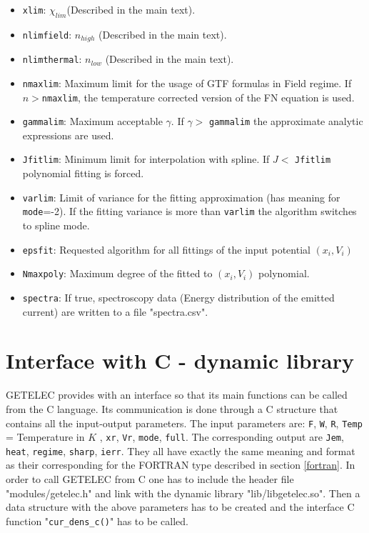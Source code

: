\documentclass[notitlepage
]{revtex4-1}
\begin{document}
\begin{itemize}
	\item \texttt{xlim}:  $\chi_{lim}$(Described in the main text).
	\item \texttt{nlimfield}: $n_{high}$ (Described in the main text).
	\item \texttt{nlimthermal}: $n_{low}$ (Described in the main text).
	\item \texttt{nmaxlim}: Maximum limit for the usage of GTF formulas in Field regime. If $n>$\texttt{nmaxlim}, the temperature corrected version of the FN equation is used.
	\item \texttt{gammalim}: Maximum acceptable $\gamma$. If $\gamma>$ \texttt{gammalim} the approximate analytic expressions are used. 
	\item \texttt{Jfitlim}: Minimum limit for interpolation with spline. If $J<$ \texttt{Jfitlim} polynomial fitting is forced.
	\item \texttt{varlim}: Limit of variance for the fitting approximation (has meaning for \texttt{mode}=-2). If the fitting variance is more than \texttt{varlim} the algorithm switches to spline mode.
	\item \texttt{epsfit}: Requested algorithm for all fittings of the input potential $(x_i, V_i)$
	\item \texttt{Nmaxpoly}: Maximum degree of the fitted to $(x_i, V_i)$ polynomial.
	\item \texttt{spectra}: If true, spectroscopy data (Energy distribution of the emitted current) are written to a file "spectra.csv".   
\end{itemize}

\section{Interface with C - dynamic library}
\label{sec:C}

GETELEC provides with an interface so that its main functions can be called from the C language. Its communication is done through a C structure that contains all the input-output parameters. The input parameters are: \texttt{F}, \texttt{W}, \texttt{R}, \texttt{Temp} = Temperature in $K$ , \texttt{xr}, \texttt{Vr}, \texttt{mode}, \texttt{full}. The corresponding output are \texttt{Jem}, \texttt{heat}, \texttt{regime}, \texttt{sharp}, \texttt{ierr}. They all have exactly the same meaning and format as their corresponding for the FORTRAN type described in section \ref{fortran}. In order to call GETELEC from C one has to include the header file "modules/getelec.h" and link with the dynamic library "lib/libgetelec.so". Then a data structure with the above parameters has to be created and the interface C function "\texttt{cur\_dens\_c()}" has to be called. 
\end{document}

